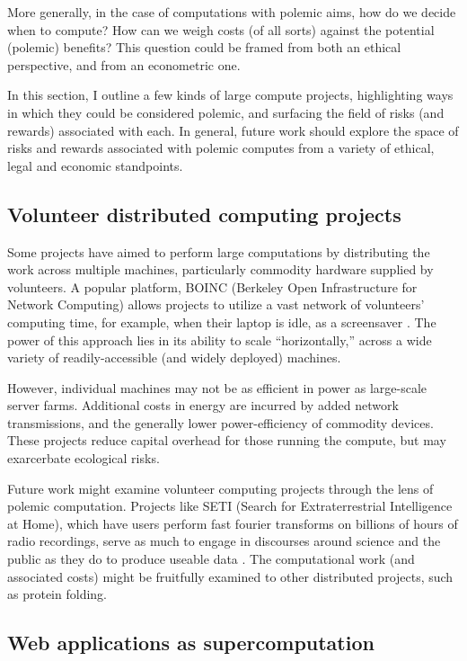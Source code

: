 \documentclass[sigconf]{acmart}
\begin{document}
More generally, in the case of computations with polemic aims,
how do we decide when to compute?
How can we weigh costs (of all sorts) against the potential (polemic) benefits?
This question could be framed from both an ethical perspective, 
and from an econometric one.

In this section, I outline a few kinds of large compute projects, 
highlighting ways in which they could be considered polemic,
and surfacing the field of risks (and rewards) associated with each.
In general, future work should explore the space of risks and rewards
associated with polemic computes from a variety of ethical, legal and economic standpoints.

\subsection{Volunteer distributed computing projects}
\label{sec:org7e1a3d6}

Some projects have aimed to perform large computations by distributing the work across multiple machines,
particularly commodity hardware supplied by volunteers.
A popular platform, BOINC (Berkeley Open Infrastructure for Network Computing)
allows projects to utilize a vast network of volunteers' computing time, 
for example, when their laptop is idle, as a screensaver
\cite{Anderson2004}.
The power of this approach lies in its ability to scale ``horizontally,''
across a wide variety of readily-accessible (and widely deployed) machines.

However, individual machines may not be as efficient in power 
as large-scale server farms.
Additional costs in energy are incurred by added network transmissions,
and the generally lower power-efficiency of commodity devices.
These projects reduce capital overhead for those running the compute,
but may exarcerbate ecological risks.

Future work might examine volunteer computing projects through the lens of polemic computation.
Projects like SETI (Search for Extraterrestrial Intelligence at Home), which have users perform fast fourier transforms on billions of hours of radio recordings,
serve as much to engage in discourses around science and the public as they do to produce useable data 
\cite{Anderson2004}.
The computational work (and associated costs) might be fruitfully examined to other distributed projects, 
such as protein folding.

\subsection{Web applications as supercomputation}
\label{sec:orgc81541e}
\end{document}
